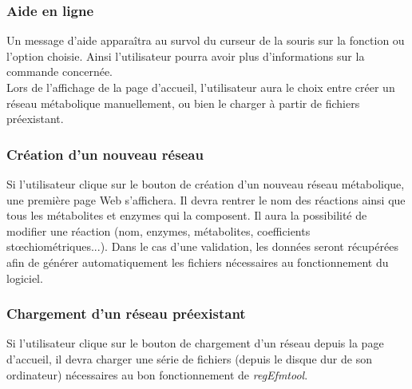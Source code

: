 \subsubsection{Aide en ligne}
Un message d'aide apparaîtra au survol du curseur de la souris sur la fonction ou l'option choisie. Ainsi l'utilisateur pourra avoir plus d'informations sur la commande concernée.\\

Lors de l'affichage de la page d'accueil, l'utilisateur aura le choix entre créer un réseau métabolique manuellement, ou bien le charger à partir de fichiers préexistant. 
			
\subsubsection{Création d'un nouveau réseau}

Si l'utilisateur clique sur le bouton de création d'un nouveau réseau métabolique, une première page Web s'affichera. Il devra rentrer le nom des réactions ainsi que tous les métabolites et enzymes qui la composent. Il aura la possibilité de modifier une réaction (nom, enzymes, métabolites, coefficients stœchiométriques...). Dans le cas d'une validation, les données seront récupérées afin de générer automatiquement les fichiers nécessaires au fonctionnement du logiciel.


\subsubsection{Chargement d'un réseau préexistant}

Si l'utilisateur clique sur le bouton de chargement d'un réseau depuis la page d'accueil, il devra charger une série de fichiers (depuis le disque dur de son ordinateur) nécessaires au bon fonctionnement de \textit{regEfmtool}. %

